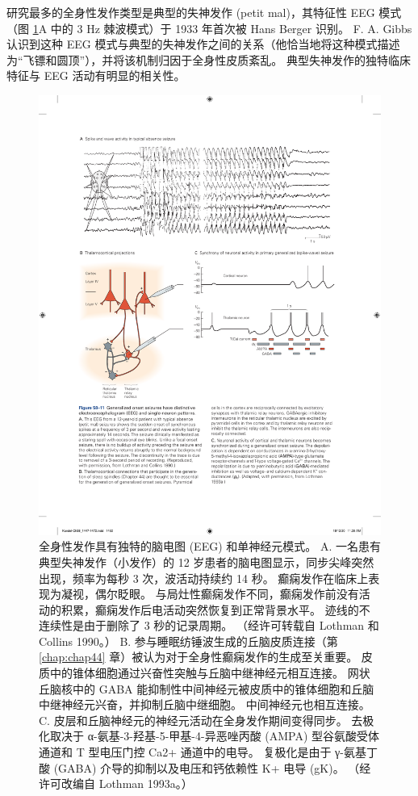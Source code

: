研究最多的全身性发作类型是典型的失神发作 (petit mal)，其特征性 EEG 模式（图 \ref{fig:58_11}A 中的 3 Hz 棘波模式）于 1933 年首次被 Hans Berger 识别。
F. A. Gibbs 认识到这种 EEG 模式与典型的失神发作之间的关系（他恰当地将这种模式描述为“飞镖和圆顶”），并将该机制归因于全身性皮质紊乱。
典型失神发作的独特临床特征与 EEG 活动有明显的相关性。


\begin{figure}[htbp]
	\centering
	\includegraphics[width=0.9\linewidth]{chap58/fig_58_11}
	\caption{全身性发作具有独特的脑电图 (EEG) 和单神经元模式。 A. 一名患有典型失神发作（小发作）的 12 岁患者的脑电图显示，同步尖峰突然出现，频率为每秒 3 次，波活动持续约 14 秒。 癫痫发作在临床上表现为凝视，偶尔眨眼。 与局灶性癫痫发作不同，癫痫发作前没有活动的积累，癫痫发作后电活动突然恢复到正常背景水平。 迹线的不连续性是由于删除了 3 秒的记录周期。 （经许可转载自 Lothman 和 Collins 1990。） B. 参与睡眠纺锤波生成的丘脑皮质连接（第 \ref{chap:chap44} 章）被认为对于全身性癫痫发作的生成至关重要。 皮质中的锥体细胞通过兴奋性突触与丘脑中继神经元相互连接。 网状丘脑核中的 GABA 能抑制性中间神经元被皮质中的锥体细胞和丘脑中继神经元兴奋，并抑制丘脑中继细胞。 中间神经元也相互连接。 C. 皮层和丘脑神经元的神经元活动在全身发作期间变得同步。 去极化取决于 α-氨基-3-羟基-5-甲基-4-异恶唑丙酸 (AMPA) 型谷氨酸受体通道和 T 型电压门控 Ca2+ 通道中的电导。 复极化是由于 γ-氨基丁酸 (GABA) 介导的抑制以及电压和钙依赖性 K+ 电导 (gK)。 （经许可改编自 Lothman 1993a。）}
	\label{fig:58_11}
\end{figure}


